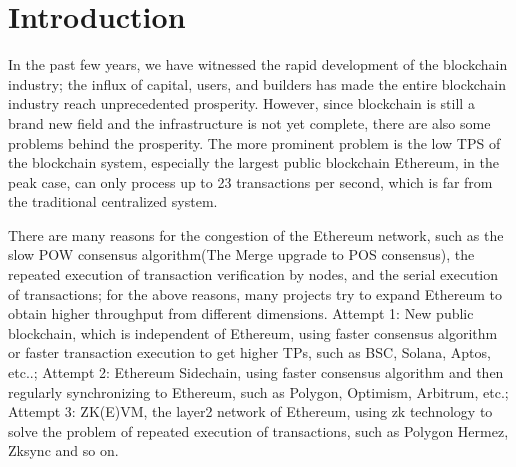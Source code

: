 \section{Introduction}\label{sec:introduction}

In the past few years, we have witnessed the rapid development of the blockchain industry; 
the influx of capital, users, and builders has made the entire blockchain industry reach 
unprecedented prosperity. However, since blockchain is still a brand new field and the
infrastructure is not yet complete, there are also some problems behind the prosperity. 
The more prominent problem is the low TPS of the blockchain system, especially the largest public
blockchain Ethereum\cite{website:Ethereum}, in the peak case\cite{website:Etherscan-chart}, can only process up to 23 
transactions per second, which is far from the traditional centralized system. 

There are many reasons for the congestion of the Ethereum\cite{website:Ethereum} network, such as the slow POW\cite{website:POW} 
consensus algorithm(The Merge upgrade\cite{website:The-Merge-upgrade} to POS\cite{website:POS} consensus), the repeated execution of 
transaction verification by nodes, and the serial execution of transactions; 
for the above reasons, many projects try to expand Ethereum to obtain higher throughput from different dimensions. Attempt 1: New public blockchain, 
which is independent of Ethereum\cite{website:Ethereum}, 
using faster consensus algorithm or faster transaction execution to get higher TPs, such as BSC\cite{website:BSC}, Solana\cite{website:Solana}, 
Aptos\cite{website:Aptos}, etc..; Attempt 2: Ethereum\cite{website:Ethereum} Sidechain, using faster consensus
algorithm and then regularly synchronizing to Ethereum\cite{website:Ethereum}, such as Polygon\cite{website:Polygon}, Optimism\cite{website:Optimism}, Arbitrum\cite{website:Arbitrum},
etc.; Attempt 3: ZK(E)VM, the layer2 network of Ethereum\cite{website:Ethereum}, using zk technology to 
solve the problem of repeated execution of transactions, such as Polygon Hermez\cite{website:Polygon-Hermez}, 
Zksync\cite{website:Zksync} and so on.

